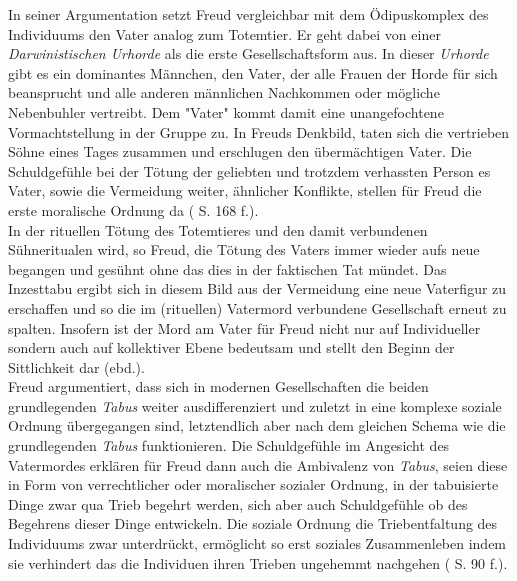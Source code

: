 \documentclass[11pt,a4paper,oneside,numbers=noenddot,bibliography=totocnumbered,DIV=13]{scrartcl}
\begin{document}
{In seiner Argumentation setzt Freud vergleichbar mit dem Ödipuskomplex des Individuums den Vater analog zum Totemtier. Er geht dabei von einer \textit{Darwinistischen Urhorde} als die erste Gesellschaftsform aus. In dieser \textit{Urhorde} gibt es ein dominantes Männchen, den Vater, der alle Frauen der Horde für sich beansprucht und alle anderen männlichen Nachkommen oder mögliche Nebenbuhler vertreibt. Dem "Vater" kommt damit eine unangefochtene Vormachtstellung in der Gruppe zu. In Freuds Denkbild, taten sich die vertrieben Söhne eines Tages zusammen und erschlugen den übermächtigen Vater. Die Schuldgefühle bei der Tötung der geliebten und trotzdem verhassten Person es Vater, sowie die Vermeidung weiter, ähnlicher Konflikte, stellen für Freud die erste moralische Ordnung da (\cite{lohmann_freud-handbuch:_2013} S. 168 f.).\\
In der rituellen Tötung des Totemtieres und den damit verbundenen Sühneritualen wird, so Freud, die Tötung des Vaters immer wieder aufs neue begangen und gesühnt ohne das dies in der faktischen Tat mündet. Das Inzesttabu ergibt sich in diesem Bild aus der Vermeidung eine neue Vaterfigur zu erschaffen und so die im (rituellen) Vatermord verbundene Gesellschaft erneut zu spalten.  Insofern ist der Mord am Vater für Freud nicht nur auf Individueller sondern auch auf kollektiver Ebene bedeutsam und stellt den Beginn der Sittlichkeit dar (ebd.).\\
Freud argumentiert, dass sich in modernen Gesellschaften die beiden grundlegenden \textit{Tabus} weiter ausdifferenziert und zuletzt in eine komplexe soziale Ordnung übergegangen sind, letztendlich aber nach dem gleichen Schema wie die grundlegenden \textit{Tabus} funktionieren. Die Schuldgefühle im Angesicht des Vatermordes erklären für Freud dann auch die Ambivalenz von \textit{Tabus}, seien diese in Form von verrechtlicher oder moralischer sozialer Ordnung, in der tabuisierte Dinge zwar qua Trieb begehrt werden, sich aber auch Schuldgefühle ob des Begehrens dieser Dinge entwickeln. Die soziale Ordnung die Triebentfaltung des Individuums zwar unterdrückt, ermöglicht so erst soziales Zusammenleben indem sie verhindert das die Individuen ihren Trieben ungehemmt nachgehen (\cite{berkel_sigmund_2008} S. 90 f.).     
}
\end{document}
